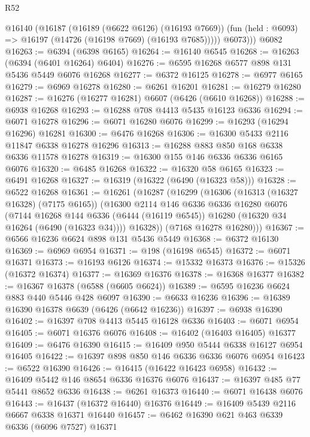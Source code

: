 \begin{lexlean}{R52}
\begin{coremodule}
        @16140
          (@16187
            (@16189 (@6622 @6126) (@16193 @7669))
            (fun (held : @6093) => @16197 (@14726 (@16198 @7669) (@16193 @7685)))))
          @6073)))
    @6082
@16263 := @6394 (@6398 @6165)
@16264 := @16140 @6545
@16268 := @16263 (@6394 (@6401 @16264) @6404)
@16276 := @6595 @16268 @6577 @898 @131 @5436 @5449 @6076 @16268
@16277 := @6372 @16125
@16278 := @6977 @6165
@16279 := @6969 @16278
@16280 := @6261 @16201
@16281 := @16279 @16280
@16287 := @16276 (@16277 @16281) @6607 (@6426 (@6610 @16268))
@16288 := @6938 @16268
@16293 := @16288 @708 @4413 @5435 @16123 @6336
@16294 := @6071 @16278
@16296 := @6071 @16280 @6076
@16299 := @16293 (@16294 @16296) @16281
@16300 := @6476 @16268
@16306 := @16300 @5433 @2116 @11847 @6338 @16278 @16296
@16313 := @16288 @883 @850 @168 @6338 @6336 @11578 @16278
@16319 := @16300 @155 @146 @6336 @6336 @6165 @6076
@16320 := @6485 @16268
@16322 := @16320 @58 @6165
@16323 := @6491 @16268
@16327 := @16319 (@16322 (@6490 (@16323 @58)))
@16328 := @6522 @16268
@16361 := @16261
    (@16287
      (@16299
        (@16306
          (@16313 (@16327 @16328) (@7175 @6165))
          (@16300
            @2114
            @146
            @6336
            @6336
            @16280
            @6076
            (@7144
              @16268
              @144
              @6336
              (@6444 (@16119 @6545))
              @16280
              (@16320 @34 @16264 (@6490 (@16323 @34))))
            @16328))
        (@7168 @16278 @16280)))
@16367 := @6566 @16236 @6624 @898 @131 @5436 @5449
@16368 := @6372 @16130
@16369 := @6969 @6954
@16371 := @198 (@16198 @6545)
@16372 := @6071 @16371
@16373 := @16193 @6126
@16374 := @15332 @16373
@16376 := @15326 (@16372 @16374)
@16377 := @16369 @16376
@16378 := @16368 @16377
@16382 := @16367 @16378 (@6588 (@6605 @6624))
@16389 := @6595 @16236 @6624 @883 @440 @5446 @428 @6097
@16390 := @6633 @16236
@16396 := @16389 @16390 @16378 @6639 (@6426 (@6642 @16236))
@16397 := @6938 @16390
@16402 := @16397 @708 @4413 @5445 @16128 @6336
@16403 := @6071 @6954
@16405 := @6071 @16376 @6076
@16408 := @16402 (@16403 @16405) @16377
@16409 := @6476 @16390
@16415 := @16409 @950 @5444 @6338 @16127 @6954 @16405
@16422 := @16397 @898 @850 @146 @6336 @6336 @6076 @6954
@16423 := @6522 @16390
@16426 := @16415 (@16422 @16423 @6958)
@16432 := @16409 @5442 @146 @8654 @6336 @16376 @6076
@16437 := @16397 @485 @77 @5441 @8652 @6336
@16438 := @6261 @16373
@16440 := @6071 @16438 @6076
@16443 := @16437 (@16372 @16440) @16376
@16449 := @16409 @5439 @2116 @6667 @6338 @16371 @16440
@16457 := @6462 @16390 @621 @463 @6339 @6336 (@6096 @7527) @16371

\end{coremodule}
\end{lexlean}

